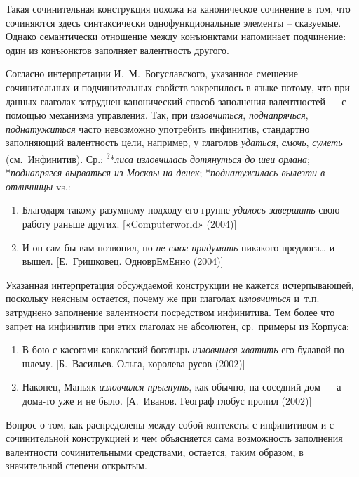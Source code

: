 Такая сочинительная конструкция похожа на каноническое сочинение в том,
что сочиняются здесь синтаксически однофункциональные элементы --
сказуемые. Однако семантически отношение между конъюнктами напоминает
подчинение: один из конъюнктов заполняет валентность другого.

Согласно интерпретации И.~М.~Богуславского, указанное смешение
сочинительных и подчинительных свойств закрепилось в языке потому, что
при данных глаголах затруднен канонический способ заполнения
валентностей --- с помощью механизма управления. Так, при
\textit{изловчиться}, \textit{поднапрячься}, \textit{поднатужиться} часто
невозможно употребить инфинитив, стандартно заполняющий валентность
цели, например, у глаголов \textit{удаться}, \textit{смочь}, \textit{суметь}
(см.~\underline{Инфинитив}). Ср.: \textsuperscript{?}*\textit{лиса
изловчилась дотянуться до шеи орлана}; *\textit{поднапрягся вырваться из
Москвы на денек}; *\textit{поднатужилась вылезти в отличницы} vs.:

\begin{enumerate}
\def\labelenumi{(\arabic{enumi})}
\setcounter{enumi}{51}
\item
  Благодаря такому разумному подходу его группе \textit{удалось завершить}
  свою работу раньше других. {[}«Computerworld» (2004){]}
\item
  И он сам бы вам позвонил, но \textit{не смог придумать} никакого
  предлога\ldots{} и вышел. {[}Е.~Гришковец. ОдноврЕмЕнно (2004){]}
\end{enumerate}

Указанная интерпретация обсуждаемой конструкции не кажется
исчерпывающей, поскольку неясным остается, почему же при глаголах
\textit{изловчиться} и~т.п. затруднено заполнение валентности посредством
инфинитива. Тем более что запрет на инфинитив при этих глаголах не
абсолютен, ср.~примеры из Корпуса:

\begin{enumerate}
\def\labelenumi{(\arabic{enumi})}
\setcounter{enumi}{53}
\item
  В бою с касогами кавказский богатырь \textit{изловчился хватить} его
  булавой по шлему. {[}Б.~Васильев. Ольга, королева русов (2002){]}
\item
  Наконец, Маньяк \textit{изловчился прыгнуть}, как обычно, на соседний
  дом ― а дома-то уже и не было. {[}А.~Иванов. Географ глобус пропил
  (2002){]}
\end{enumerate}

Вопрос о том, как распределены между собой контексты с инфинитивом и с
сочинительной конструкцией и чем объясняется сама возможность заполнения
валентности сочинительными средствами, остается, таким образом, в
значительной степени открытым.

